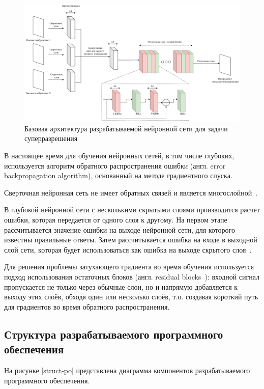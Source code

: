 \begin{figure}[H]
    \centering
    \includegraphics[scale=0.5]{assets/model.pdf}
    \caption{Базовая архитектура разрабатываемой нейронной сети для задачи суперразрешения}
    \label{model}
\end{figure}

В настоящее время для обучения нейронных сетей, в том числе глубоких, используется алгоритм обратного распространения ошибки (англ. error backpropagation algorithm), основанный на методе градиентного спуска. 

Сверточная нейронная сеть не имеет обратных связей и является многослойной~\cite{layers2}.

В глубокой нейронной сети с несколькими скрытыми слоями производится расчет ошибки, которая передается от одного слоя к другому. На первом этапе рассчитывается значение ошибки на выходе нейронной сети, для которого известны правильные ответы. Затем рассчитывается ошибка на входе в выходной слой сети, которая будет использоваться как ошибка на выходе скрытого слоя~\cite{train2, train}.

Для решения проблемы затухающего градиента во время обучения используется подход использования остаточных блоков (англ. residual blocks~\cite{residual}): входной сигнал пропускается не только через обычные слои, но и напрямую добавляется к выходу этих слоёв, обходя один или несколько слоёв, т.о. создавая короткий путь для градиентов во время обратного распространения.

\subsection{Структура разрабатываемого программного обеспечения}

На рисунке \ref{struct-po} представлена диаграмма компонентов \cite{uml} разрабатываемого программного обеспечения.

